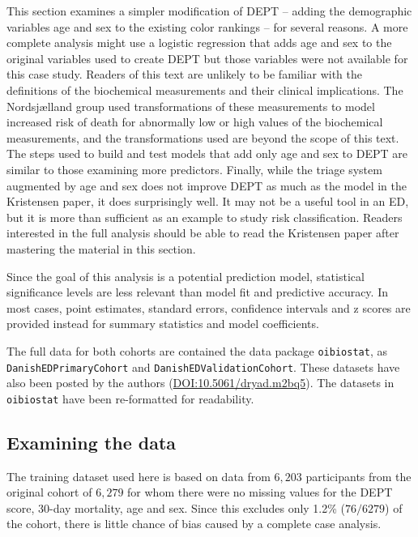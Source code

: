 This section examines a simpler modification of DEPT -- adding the demographic variables age and sex to the existing color rankings -- for several reasons. A more complete analysis might use a logistic regression that adds age and sex to the original variables used to create DEPT but those variables were not available for this case study.   Readers of this text are unlikely to be familiar with the definitions of the biochemical measurements and their clinical implications. The Nordsj{\ae}lland group used transformations of these measurements to model increased risk of death for abnormally low or high values of the biochemical measurements, and the transformations used are beyond the scope of this text. The steps used to build and test models that add only age and sex to DEPT are similar to those examining more predictors. Finally, while the triage system augmented by age and sex does not improve DEPT as much as the model in the Kristensen paper, it does surprisingly well.  It may not be a useful tool in an ED, but it is more than sufficient as an example to study risk classification.    Readers interested in the full analysis should be able to read the Kristensen paper after mastering the material in this section.

Since the goal of this analysis is a potential prediction model, statistical significance levels are less relevant than model fit and predictive accuracy.  In most cases, point estimates, standard errors, confidence intervals and z scores are provided instead for summary statistics and model coefficients.  

The full data for both cohorts are contained the data package \texttt{oibiostat}, as \texttt{DanishEDPrimaryCohort} and \texttt{DanishEDValidationCohort}.  These datasets have also been posted by the authors (\url{DOI:10.5061/dryad.m2bq5}).  The datasets in \texttt{oibiostat} have been re-formatted for readability.

\subsection{Examining the data}
\label{section:examiningDataDanishED}

The training dataset used here is based on data from $6,203$ participants from the original cohort of $6,279$ for whom there were no missing values for the DEPT score, 30-day mortality, age and sex.  Since this excludes only 1.2\% ($76/6279$) of the cohort, there is little chance of bias caused by a complete case analysis.  

